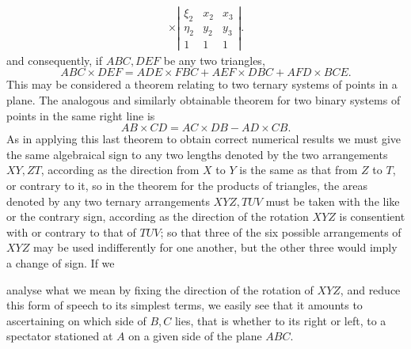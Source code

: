 \documentclass[11pt]{article}
\newcommand{\sourcepage}[1]{\marginpar{\scriptsize p.~#1}}
\begin{document}
{{\[\begin{aligned}
\times
\left|\begin{array}{ccc}\xi_2&x_2&x_3\\ \eta_2&y_2&y_3\\1&1&1\end{array}\right|.
\end{aligned}
\]
and consequently, if $ABC,DEF$ be any two triangles,
\[
ABC\times DEF=ADE\times FBC+AEF\times DBC+AFD\times BCE.
\]
This may be considered a theorem relating to two ternary systems of points in a plane. The analogous and similarly obtainable theorem for two binary systems of points in the same right line is
\[
AB\times CD=AC\times DB-AD\times CB.
\]
As in applying this last theorem to obtain correct numerical results we must give the same algebraical sign to any two lengths denoted by the two arrangements $XY,ZT$, according as the direction from $X$ to $Y$ is the same as that from $Z$ to $T$, or contrary to it, so in the theorem for the products of triangles, the areas denoted by any two ternary arrangements $XYZ,TUV$ must be taken with the like or the contrary sign, according as the direction of the rotation $XYZ$ is consentient with or contrary to that of $TUV$; so that three of the six possible arrangements of $XYZ$ may be used indifferently for one another, but the other three would imply a change of sign. If we

\sourcepage{390}
analyse what we mean by fixing the direction of the rotation of $XYZ$, and reduce this form of speech to its simplest terms, we easily see that it amounts to ascertaining on which side of $B,C$ lies, that is whether to its right or left, to a spectator stationed at $A$ on a given side of the plane $ABC$.

}}
\end{document}
